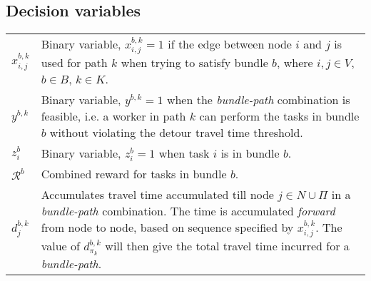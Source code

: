 \documentclass{article}
\begin{document}
\begin{multicols}{2}
\columnbreak

\section{Decision variables}
\renewcommand{\arraystretch}{1.5}
\begin{supertabular}{L{0.58cm} L{7.2cm}}

	$x_{i,j}^{b,k}$ & Binary variable, $x_{i,j}^{b,k}=1$ if the edge between node $i$ and $j$ is used for path $k$ when trying to satisfy bundle $b$, where $i,j \in V$, $b \in B$, $k \in K$. \\
	$y^{b,k}$ & Binary variable, $y^{b,k}=1$ when the \textit{bundle-path} combination is feasible, i.e. a worker in path $k$ can perform the tasks in bundle $b$ without violating the detour travel time threshold. \\
	$z_i ^b$ & Binary variable, $z_i ^b=1$ when task $i$ is in bundle $b$. \\
	$\mathcal{R}^b$ & Combined reward for tasks in bundle $b$. \\
	$d_j^{b, k}$ & Accumulates travel time accumulated till node $j \in N \cup \Pi$ in a \textit{bundle-path} combination. The time is accumulated \textit{forward} from node to node, based on sequence specified by $x_{i, j}^{b, k}$. The value of $d_{\pi_k}^{b, k}$ will then give the total travel time incurred for a \textit{bundle-path}. \\

\end{supertabular}
\end{multicols}
\end{document}
